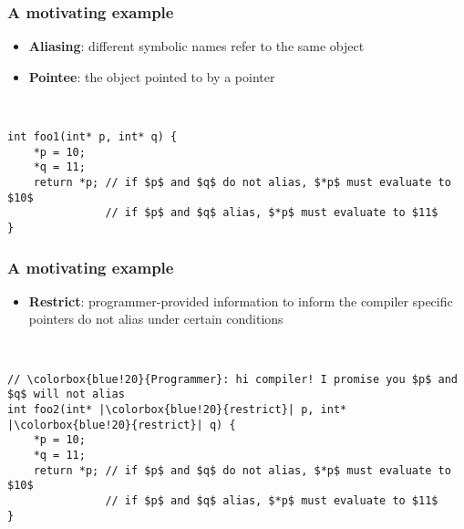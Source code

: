 \begin{frame}[fragile]
\raggedright
\frametitle{A motivating example}

\begin{itemize}
    \item \textbf{Aliasing}: different symbolic names refer to the same object
    \item \textbf{Pointee}: the object pointed to by a pointer
\end{itemize}

\leavevmode\\

\begin{verbatim}
int foo1(int* p, int* q) {   
    *p = 10;
    *q = 11;
    return *p; // if $p$ and $q$ do not alias, $*p$ must evaluate to $10$
               // if $p$ and $q$ alias, $*p$ must evaluate to $11$
}
\end{verbatim}

\end{frame}

\begin{frame}[fragile]
\raggedright
\frametitle{A motivating example}

\begin{itemize}
    \item \textbf{Restrict}: programmer-provided information to inform the compiler specific pointers do not alias under certain conditions
\end{itemize}

\leavevmode \\

\begin{verbatim}
// \colorbox{blue!20}{Programmer}: hi compiler! I promise you $p$ and $q$ will not alias
int foo2(int* |\colorbox{blue!20}{restrict}| p, int* |\colorbox{blue!20}{restrict}| q) {
    *p = 10;
    *q = 11;
    return *p; // if $p$ and $q$ do not alias, $*p$ must evaluate to $10$
               // if $p$ and $q$ alias, $*p$ must evaluate to $11$
}
\end{verbatim}

\begin{figure}
\centering
{}
\end{figure}

\end{frame}


